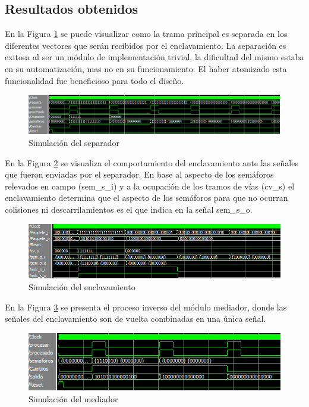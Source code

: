 	\subsection{Resultados obtenidos}
				
		En la Figura \ref{fig:Test_Separador} se puede visualizar como la trama principal es separada en los diferentes vectores que serán recibidos por el enclavamiento. La separación es exitosa al ser un módulo de implementación trivial, la dificultad del mismo estaba en su automatización, mas no en su funcionamiento. El haber atomizado esta funcionalidad fue beneficioso para todo el diseño.
		
		\begin{figure}[!hbt]
		\centering
		\includegraphics[scale=0.6]{./Figures/Test/Separador}
			\caption{Simulación del separador}
			\label{fig:Test_Separador}
		\end{figure}
		
		En la Figura \ref{fig:Test_Enclavamiento} se visualiza el comportamiento del enclavamiento ante las señales que fueron enviadas por el separador. En base al aspecto de los semáforos relevados en campo (sem\_s\_i) y a la ocupación de los tramos de vías (cv\_s) el enclavamiento determina que el aspecto de los semáforos para que no ocurran colisiones ni descarrilamientos es el que indica en la señal sem\_s\_o.
		
		\begin{figure}[!hbt]
		\centering
		\includegraphics[scale=0.65]{./Figures/Test/Enclavamiento}
			\caption{Simulación del enclavamiento}
			\label{fig:Test_Enclavamiento}
		\end{figure}

		
		En la Figura \ref{fig:Test_Mediador} se presenta el proceso inverso del módulo mediador, donde las señales del enclavamiento son de vuelta combinadas en una única señal.
		
		\begin{figure}[!hbt]
		\centering
		\includegraphics[scale=0.8]{./Figures/Test/Mediador}
			\caption{Simulación del mediador}
			\label{fig:Test_Mediador}
		\end{figure}
		
